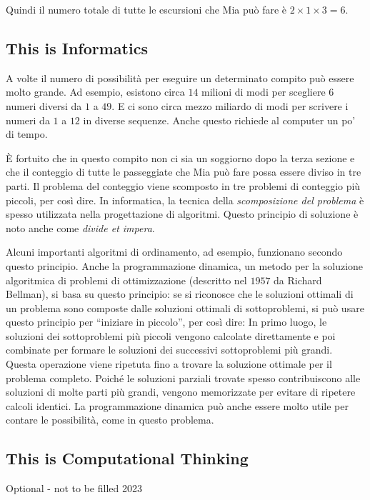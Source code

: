 \documentclass[a4paper,11pt]{report}
\begin{document}
Quindi il numero totale di tutte le escursioni che Mia può fare è ${2 \times 1 \times 3 = 6}$.


\subsection*{This is Informatics}

A volte il numero di possibilità per eseguire un determinato compito può essere molto grande.  Ad esempio, esistono circa $14$ milioni di modi per scegliere $6$ numeri diversi da $1$ a $49$.  E ci sono circa mezzo miliardo di modi per scrivere i numeri da $1$ a $12$ in diverse sequenze.  Anche questo richiede al computer un po’ di tempo.

È fortuito che in questo compito non ci sia un soggiorno dopo la terza sezione e che il conteggio di tutte le passeggiate che Mia può fare possa essere diviso in tre parti.  Il problema del conteggio viene scomposto in tre problemi di conteggio più piccoli, per così dire.  In informatica, la tecnica della \emph{scomposizione del problema} è spesso utilizzata nella progettazione di algoritmi.  Questo principio di soluzione è noto anche come \emph{divide et impera}.

Alcuni importanti algoritmi di ordinamento, ad esempio, funzionano secondo questo principio.  Anche la programmazione dinamica, un metodo per la soluzione algoritmica di problemi di ottimizzazione (descritto nel $1957$ da Richard Bellman), si basa su questo principio: se si riconosce che le soluzioni ottimali di un problema sono composte dalle soluzioni ottimali di sottoproblemi, si può usare questo principio per \enquote{iniziare in piccolo}, per così dire:  In primo luogo, le soluzioni dei sottoproblemi più piccoli vengono calcolate direttamente e poi combinate per formare le soluzioni dei successivi sottoproblemi più grandi.  Questa operazione viene ripetuta fino a trovare la soluzione ottimale per il problema completo.  Poiché le soluzioni parziali trovate spesso contribuiscono alle soluzioni di molte parti più grandi, vengono memorizzate per evitare di ripetere calcoli identici.  La programmazione dinamica può anche essere molto utile per contare le possibilità, come in questo problema.


\subsection*{This is Computational Thinking}

Optional - not to be filled 2023
\end{document}
